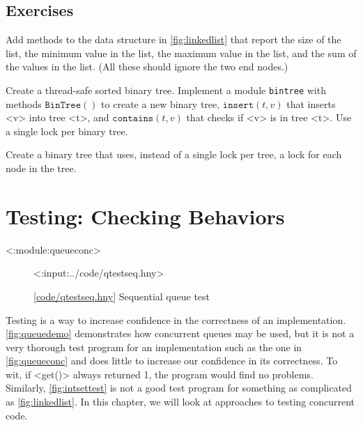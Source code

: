 \documentclass{report}
\newcommand{\harmonylink}[1]{%
[\href{https://harmony.cs.cornell.edu/#1}{\underline{#1}}]%
}
\newenvironment{code}{
\tcolorbox
}{
\endtcolorbox
}
\begin{document}
\section*{Exercises}
\begin{problems}
\item Add methods to the data structure in \autoref{fig:linkedlist}
that report the size of the list, the minimum value in the
list, the maximum value in the list, and the sum of the values in the list.
(All these should ignore the two end nodes.)
\item Create a thread-safe sorted binary tree.  Implement a module \texttt{bintree}
with methods
$\mathtt{BinTree}()$ to create a new binary tree, $\mathtt{insert}(t, v)$ that inserts <{v}> into
tree <{t}>, and $\mathtt{contains}(t, v)$ that checks if <{v}> is in tree <{t}>.  Use a single
lock per binary tree.
\item Create a binary tree that uses, instead of a single lock per tree,
a lock for each node in the tree.
\end{problems}

\chapter{Testing: Checking Behaviors}
\label{ch:testing}
<{:module:queueconc}>

\begin{figure}
\begin{code}
<{:input:../code/qtestseq.hny}>
\end{code}
\caption{\harmonylink{code/qtestseq.hny} Sequential queue test}
\label{fig:qtestseq}
\end{figure}

Testing is a way to increase confidence in the correctness
of an implementation.
\autoref{fig:queuedemo} demonstrates how concurrent queues
may be used, but it is not a very thorough test program
for an implementation such as the one in \autoref{fig:queueconc}
and does little to increase our confidence in its correctness.
To wit, if <{get()}> always returned 1, the program
would find no problems.
Similarly, \autoref{fig:intsettest} is not a good test program
for something as complicated as \autoref{fig:linkedlist}.
In this chapter, we will look at approaches to testing
concurrent code.
\end{document}
